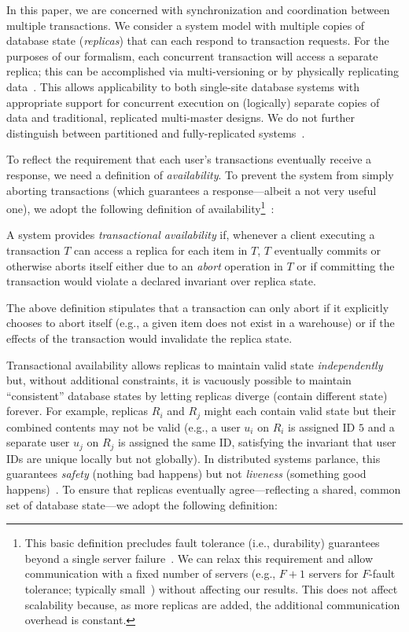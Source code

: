  In this paper, we are concerned with
synchronization and coordination between multiple transactions. We
consider a system model with multiple copies of database state
(\textit{replicas}) that can each respond to transaction requests. For
the purposes of our formalism, each concurrent transaction will access
a separate replica; this can be accomplished via multi-versioning or
by physically replicating data~\cite{bernstein-book}. This allows
applicability to both single-site database systems with appropriate
support for concurrent execution on (logically) separate copies of
data and traditional, replicated multi-master designs. We do not
further distinguish between partitioned and fully-replicated
systems~\cite{hat-vldb}.

 To reflect the requirement that each user's
transactions eventually receive a response, we need a definition of
\textit{availability}. To prevent the system from simply aborting
transactions (which guarantees a response---albeit a not very useful
one), we adopt the following definition of availability\footnote{This
  basic definition precludes fault tolerance (i.e., durability)
  guarantees beyond a single server failure~\cite{hat-vldb}. We can
  relax this requirement and allow communication with a fixed number
  of servers (e.g., $F+1$ servers for $F$-fault tolerance; typically
  small~\cite{spanner,dynamo,megastore}) without affecting our
  results. This does not affect scalability because, as more replicas
  are added, the additional communication overhead is
  constant.}~\cite{hat-vldb}:

\begin{definition} 
A system provides \textit{transactional availability} if, whenever a
client executing a transaction $T$ can access a replica for each item
in $T$, $T$ eventually commits or otherwise aborts itself either due
to an \textit{abort} operation in $T$ or if committing the transaction
would violate a declared invariant over replica state.
\end{definition}

The above definition stipulates that a transaction can only abort if
it explicitly chooses to abort itself (e.g., a given item does not
exist in a warehouse) or if the effects of the transaction would
invalidate the replica state.

 Transactional availability allows replicas to
maintain valid state \textit{independently} but, without additional
constraints, it is vacuously possible to maintain ``consistent''
database states by letting replicas diverge (contain different state)
forever. For example, replicas $R_i$ and $R_j$ might each contain
valid state but their combined contents may not be valid (e.g., a user
$u_i$ on $R_i$ is assigned ID $5$ and a separate user $u_j$ on $R_j$
is assigned the same ID, satisfying the invariant that user IDs are
unique locally but not globally). In distributed systems parlance,
this guarantees \textit{safety} (nothing bad happens) but not
\textit{liveness} (something good happens)~\cite{schneider-concurrent}. To
ensure that replicas eventually agree---reflecting a shared, common
set of database state---we adopt the following definition:

